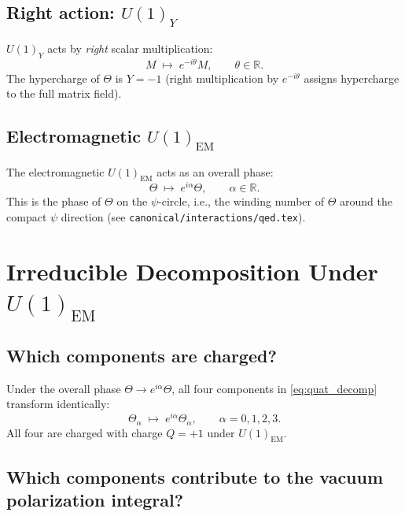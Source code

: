 \documentclass[12pt,a4paper]{article}
\theoremstyle{definition}
\theoremstyle{remark}
\newcommand{\R}{\mathbb{R}}
\begin{document}
\subsection{Right action: $U(1)_Y$}

$U(1)_Y$ acts by \emph{right} scalar multiplication:
\begin{equation}
  M \;\longmapsto\; e^{-i\theta} M, \qquad \theta \in \R.
  \label{eq:U1Y_action}
\end{equation}
The hypercharge of $\Theta$ is $Y = -1$ (right multiplication by $e^{-i\theta}$
assigns hypercharge to the full matrix field).

\subsection{Electromagnetic $U(1)_\mathrm{EM}$}

The electromagnetic $U(1)_\mathrm{EM}$ acts as an overall phase:
\begin{equation}
  \Theta \;\longmapsto\; e^{i\alpha} \Theta,
  \qquad \alpha \in \R.
  \label{eq:U1EM_action}
\end{equation}
This is the phase of $\Theta$ on the $\psi$-circle, i.e., the winding number
of $\Theta$ around the compact $\psi$ direction (see \texttt{canonical/interactions/qed.tex}).

\section{Irreducible Decomposition Under $U(1)_\mathrm{EM}$}
\label{sec:irrep}

\subsection{Which components are charged?}

Under the overall phase $\Theta \to e^{i\alpha}\Theta$, all four components
in \eqref{eq:quat_decomp} transform identically:
\begin{equation}
  \Theta_\alpha \;\longmapsto\; e^{i\alpha} \Theta_\alpha, \qquad \alpha = 0,1,2,3.
  \label{eq:all_charged}
\end{equation}
All four are charged with charge $Q = +1$ under $U(1)_\mathrm{EM}$.

\subsection{Which components contribute to the vacuum polarization integral?}
\end{document}
